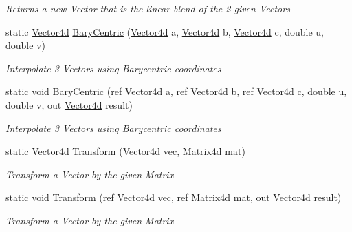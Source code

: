 \begin{DoxyCompactItemize}
\begin{DoxyCompactList}\small\item\em Returns a new Vector that is the linear blend of the 2 given Vectors \end{DoxyCompactList}\item 
static \hyperlink{struct_open_t_k_1_1_vector4d}{Vector4d} \hyperlink{struct_open_t_k_1_1_vector4d_a5107e878208d5be112a8ca79a4a188f6}{Bary\-Centric} (\hyperlink{struct_open_t_k_1_1_vector4d}{Vector4d} a, \hyperlink{struct_open_t_k_1_1_vector4d}{Vector4d} b, \hyperlink{struct_open_t_k_1_1_vector4d}{Vector4d} c, double u, double v)
\begin{DoxyCompactList}\small\item\em Interpolate 3 Vectors using Barycentric coordinates \end{DoxyCompactList}\item 
static void \hyperlink{struct_open_t_k_1_1_vector4d_a9f231d75d7461204821023277b30a9df}{Bary\-Centric} (ref \hyperlink{struct_open_t_k_1_1_vector4d}{Vector4d} a, ref \hyperlink{struct_open_t_k_1_1_vector4d}{Vector4d} b, ref \hyperlink{struct_open_t_k_1_1_vector4d}{Vector4d} c, double u, double v, out \hyperlink{struct_open_t_k_1_1_vector4d}{Vector4d} result)
\begin{DoxyCompactList}\small\item\em Interpolate 3 Vectors using Barycentric coordinates\end{DoxyCompactList}\item 
static \hyperlink{struct_open_t_k_1_1_vector4d}{Vector4d} \hyperlink{struct_open_t_k_1_1_vector4d_aa9b52a2f5411f21dc183b629295d4ebf}{Transform} (\hyperlink{struct_open_t_k_1_1_vector4d}{Vector4d} vec, \hyperlink{struct_open_t_k_1_1_matrix4d}{Matrix4d} mat)
\begin{DoxyCompactList}\small\item\em Transform a Vector by the given Matrix\end{DoxyCompactList}\item 
static void \hyperlink{struct_open_t_k_1_1_vector4d_a4b3990263053e0c464d79e56e46af7d6}{Transform} (ref \hyperlink{struct_open_t_k_1_1_vector4d}{Vector4d} vec, ref \hyperlink{struct_open_t_k_1_1_matrix4d}{Matrix4d} mat, out \hyperlink{struct_open_t_k_1_1_vector4d}{Vector4d} result)
\begin{DoxyCompactList}\small\item\em Transform a Vector by the given Matrix\end{DoxyCompactList}\item 

\end{DoxyCompactItemize}
